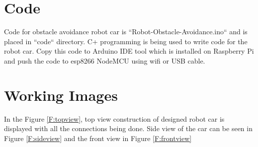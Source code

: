 \documentclass[sigconf]{acmart}
\begin{document}
\section{Code}
Code for obstacle avoidance robot car is ``Robot-Obstacle-Avoidance.ino`` 
and is placed in ``code`` directory. C+ programming is being used to write 
code for the robot car. Copy this code to Arduino IDE tool which is installed 
on Raspberry Pi and push the code to esp8266 NodeMCU using wifi or USB cable.

\section{Working Images}
In the Figure \ref{F:topview}, top view construction of designed robot car 
is displayed with all the connections being done. Side view of the car can 
be seen in Figure \ref{F:sideview} and the front view in Figure \ref{F:frontview}
\end{document}

